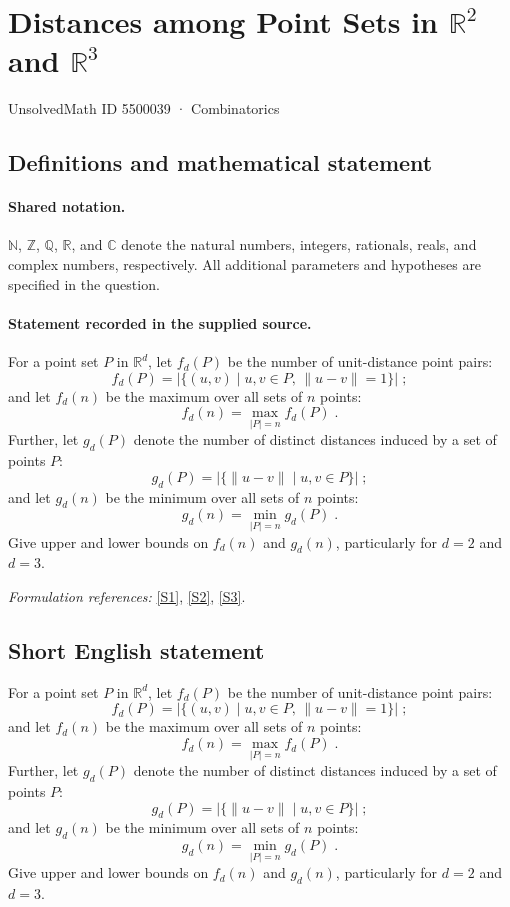 \documentclass[11pt]{article}
\newcommand{\sref}[2]{\hyperlink{source:#1:#2}{[S#2]}}
\begin{document}
\setcounter{section}{5500038}
\section{\texorpdfstring{Distances among Point Sets in $\mathbb{R}^2$ and $\mathbb{R}^3$}{Distances among Point Sets in mathbbR\textasciicircum{}2 and mathbbR\textasciicircum{}3}}\label{5500039}
{\small UnsolvedMath ID 5500039 · Combinatorics}
\subsection{Definitions and mathematical statement}

\paragraph{Shared notation.}$\mathbb N$, $\mathbb Z$, $\mathbb Q$, $\mathbb R$, and $\mathbb C$ denote the natural numbers, integers, rationals, reals, and complex numbers, respectively. All additional parameters and hypotheses are specified in the question.


\paragraph{Statement recorded in the supplied source.}
For a point set $P$ in $\mathbb{R}^d$, let $f_d(P)$ be the number of unit-distance point pairs: $$f_d(P) = \left| \{ (u,v) \mid u, v \in P, \, \|u-v\| = 1 \} \right| \;;$$ and let $f_d(n)$ be the maximum over all sets of $n$ points: $$f_d(n) = \max_{|P| = n} f_d(P) \;.$$ Further, let $g_d(P)$ denote the number of distinct distances induced by a set of points $P$: $$g_d(P) = \left| \{ \|u-v\| \mid u, v \in P \} \right| \;;$$ and let $g_d(n)$ be the minimum over all sets of $n$ points: $$g_d(n) = \min_{|P|=n} g_d(P) \;.$$ Give upper and lower bounds on $f_d(n)$ and $g_d(n)$, particularly for $d=2$ and $d=3$.
\par\smallskip\textit{Formulation references:} \sref{5500039}{1}, \sref{5500039}{2}, \sref{5500039}{3}.
\subsection{Short English statement}
For a point set $P$ in $\mathbb{R}^d$, let $f_d(P)$ be the number of unit-distance point pairs: $$f_d(P) = \left| \{ (u,v) \mid u, v \in P, \, \|u-v\| = 1 \} \right| \;;$$ and let $f_d(n)$ be the maximum over all sets of $n$ points: $$f_d(n) = \max_{|P| = n} f_d(P) \;.$$ Further, let $g_d(P)$ denote the number of distinct distances induced by a set of points $P$: $$g_d(P) = \left| \{ \|u-v\| \mid u, v \in P \} \right| \;;$$ and let $g_d(n)$ be the minimum over all sets of $n$ points: $$g_d(n) = \min_{|P|=n} g_d(P) \;.$$ Give upper and lower bounds on $f_d(n)$ and $g_d(n)$, particularly for $d=2$ and $d=3$.
\end{document}
